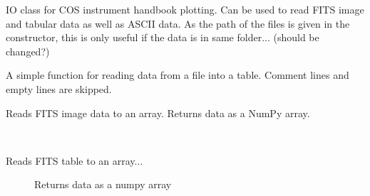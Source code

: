 \documentclass[letterpaper,10pt,english]{sphinxmanual}
\begin{document}
\begin{fulllineitems}
\label{SamPy.smnIO:SamPy.smnIO.IO.COSHBIO}
IO class for COS instrument handbook plotting.
Can be used to read FITS image and tabular data as well as ASCII data.
As the path of the files is given in the constructor, this is only useful
if the data is in same folder... (should be changed?)


\begin{fulllineitems}
\label{SamPy.smnIO:SamPy.smnIO.IO.COSHBIO.ASCIITable}
A simple function for reading data from a file into a table.
Comment lines and empty lines are skipped.

\end{fulllineitems}



\begin{fulllineitems}
\label{SamPy.smnIO:SamPy.smnIO.IO.COSHBIO.FITSImage}
Reads FITS image data to an array.
Returns data as a NumPy array.

\end{fulllineitems}



\begin{fulllineitems}
\label{SamPy.smnIO:SamPy.smnIO.IO.COSHBIO.FITSTable}~\begin{description}
\item[{Reads FITS table to an array...}] \leavevmode
Returns data as a numpy array

\end{description}

\end{fulllineitems}



\begin{fulllineitems}
\label{SamPy.smnIO:SamPy.smnIO.IO.COSHBIO.Header}
\end{fulllineitems}



\end{fulllineitems}
\end{document}
